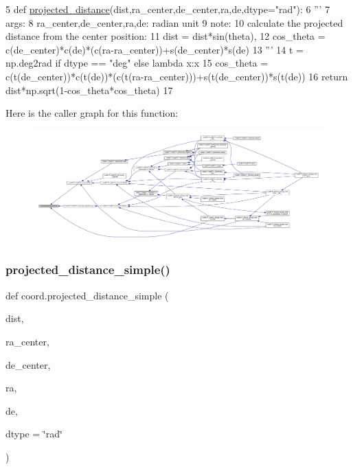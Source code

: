 \begin{DoxyCode}
5 \textcolor{keyword}{def }\hyperlink{namespacecoord_a46aebc3089e078f4597812fecdd0975f}{projected\_distance}(dist,ra\_center,de\_center,ra,de,dtype="rad"):
6     \textcolor{stringliteral}{'''}
7 \textcolor{stringliteral}{    args:}
8 \textcolor{stringliteral}{        ra\_center,de\_center,ra,de: radian unit}
9 \textcolor{stringliteral}{    note:}
10 \textcolor{stringliteral}{        calculate the projected distance from the center position:}
11 \textcolor{stringliteral}{        dist = dist*sin(theta),}
12 \textcolor{stringliteral}{        cos\_theta = c(de\_center)*c(de)*(c(ra-ra\_center))+s(de\_center)*s(de)}
13 \textcolor{stringliteral}{    '''}
14     t = np.deg2rad \textcolor{keywordflow}{if} dtype == \textcolor{stringliteral}{"deg"} \textcolor{keywordflow}{else} \textcolor{keyword}{lambda} x:x
15     cos\_theta = c(t(de\_center))*c(t(de))*(c(t(ra-ra\_center)))+s(t(de\_center))*s(t(de))
16     \textcolor{keywordflow}{return} dist*np.sqrt(1-cos\_theta*cos\_theta)
17 
\end{DoxyCode}
Here is the caller graph for this function\+:\nopagebreak
\begin{figure}[H]
\begin{center}
\leavevmode
\includegraphics[width=350pt]{d2/df4/namespacecoord_a46aebc3089e078f4597812fecdd0975f_icgraph}
\end{center}
\end{figure}
\mbox{\label{namespacecoord_a6cca1fe4ad65d56023a02550cbba8ce8}} 
\subsubsection{\texorpdfstring{projected\+\_\+distance\+\_\+simple()}{projected\_distance\_simple()}}
{\footnotesize\ttfamily def coord.\+projected\+\_\+distance\+\_\+simple (\begin{DoxyParamCaption}\item[{}]{dist,  }\item[{}]{ra\+\_\+center,  }\item[{}]{de\+\_\+center,  }\item[{}]{ra,  }\item[{}]{de,  }\item[{}]{dtype = {\ttfamily \char`\"{}rad\char`\"{}} }\end{DoxyParamCaption})}

